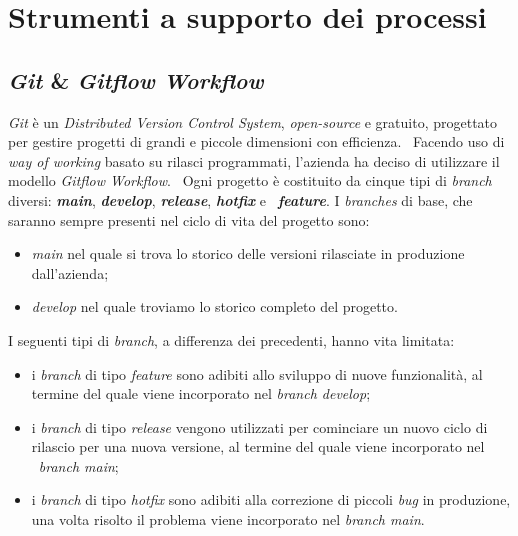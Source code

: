 
\section{Strumenti a supporto dei processi}

\subsection{\emph{Git} \& \emph{Gitflow Workflow}}
\emph{Git} è un \emph{Distributed Version Control System}, \emph{open-source} e gratuito, progettato per gestire progetti di grandi e piccole dimensioni con efficienza. \
Facendo uso di \emph{way of working} basato su rilasci programmati, l'azienda ha deciso di utilizzare il modello \emph{Gitflow Workflow}. \
Ogni progetto è costituito da cinque tipi di \emph{branch} diversi: \textbf{\emph{main}}, \textbf{\emph{develop}}, \textbf{\emph{release}}, \textbf{\emph{hotfix}} e \
\textbf{\emph{feature}}. I \emph{branches} di base, che saranno sempre presenti nel ciclo di vita del progetto sono:
\begin{itemize}
  \item \emph{main} nel quale si trova lo storico delle versioni rilasciate in produzione dall'azienda;
  \item \emph{develop} nel quale troviamo lo storico completo del progetto. 
\end{itemize}  

I seguenti tipi di \emph{branch}, a differenza dei precedenti, hanno vita limitata: \
\begin{itemize}
  \item i \emph{branch} di tipo \emph{feature} sono adibiti allo sviluppo di nuove funzionalità, al termine del quale viene incorporato nel \emph{branch develop}; 
  \item i \emph{branch} di tipo \emph{release} vengono utilizzati per cominciare un nuovo ciclo di rilascio per una nuova versione, al termine del quale viene incorporato nel \
  \emph{branch main}; 
  \item i \emph{branch} di tipo \emph{hotfix} sono adibiti alla correzione di piccoli \emph{bug} in produzione, una volta risolto il problema viene incorporato nel \emph{branch main}.
\end{itemize}

